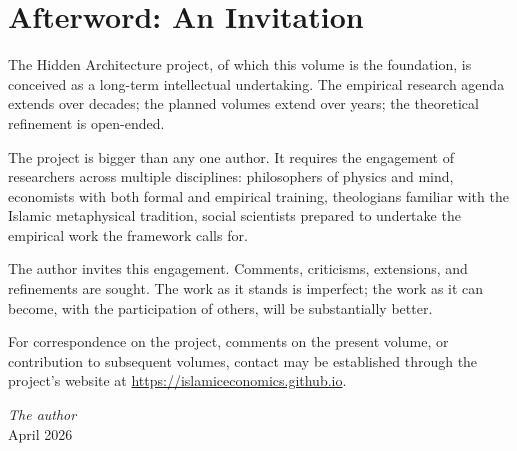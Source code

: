 \cleardoublepage

\chapter*{Afterword: An Invitation}

The Hidden Architecture project, of which this volume is the
foundation, is conceived as a long-term intellectual undertaking.
The empirical research agenda extends over decades; the planned
volumes extend over years; the theoretical refinement is open-ended.

The project is bigger than any one author. It requires the
engagement of researchers across multiple disciplines:
philosophers of physics and mind, economists with both formal and
empirical training, theologians familiar with the Islamic
metaphysical tradition, social scientists prepared to undertake
the empirical work the framework calls for.

The author invites this engagement. Comments, criticisms,
extensions, and refinements are sought. The work as it stands is
imperfect; the work as it can become, with the participation of
others, will be substantially better.

For correspondence on the project, comments on the present
volume, or contribution to subsequent volumes, contact may be
established through the project's website at
\url{https://islamiceconomics.github.io}.

\bigskip

\hfill\textit{The author}\\
\hfill April 2026

\cleardoublepage

